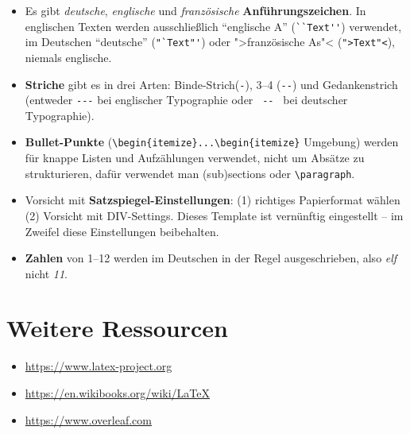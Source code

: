 \documentclass[twoside, a4paper, DIV=11, open=any, bibliography=totoc]{scrbook}
\begin{document}
\begin{itemize}
    \item Es gibt \textit{deutsche}, \textit{englische} und \textit{französische} \textbf{Anführungszeichen}. In englischen Texten werden ausschließlich ``englische A'' (\verb+``Text''+) verwendet, im Deutschen "`deutsche"' (\verb+"`Text"'+) oder ">französische As"< (\verb+">Text"<+), niemals englische.
    \item \textbf{Striche} gibt es in drei Arten: Binde-Strich(\verb+-+), 3--4 (\verb+--+) und Gedankenstrich (entweder \verb+---+ bei englischer Typographie oder \verb+ -- + bei deutscher Typographie).
    \item \textbf{Bullet-Punkte} (\verb+\begin{itemize}...\begin{itemize}+ Umgebung) werden für knappe Listen und Aufzählungen verwendet, nicht um Absätze zu strukturieren, dafür verwendet man (sub)sections oder \verb+\paragraph+.
    \item Vorsicht mit \textbf{Satzspiegel-Einstellungen}: (1) richtiges Papierformat wählen (2) Vorsicht mit DIV-Settings. Dieses Template ist vernünftig eingestellt -- im Zweifel diese Einstellungen beibehalten.
    \item \textbf{Zahlen} von 1--12 werden im Deutschen in der Regel ausgeschrieben, also \textit{elf} nicht \textit{11}.
\end{itemize}


\section{Weitere Ressourcen} \label{sec:ressourcen}

\begin{itemize}
    \item \url{https://www.latex-project.org}
    \item \url{https://en.wikibooks.org/wiki/LaTeX}
    \item \url{https://www.overleaf.com}
\end{itemize}






\end{document}
